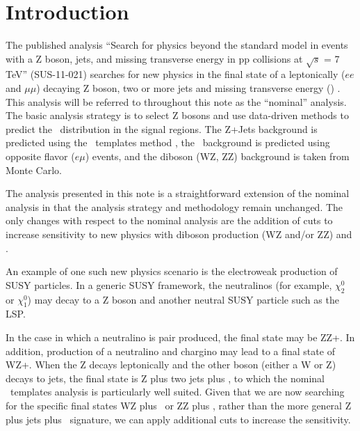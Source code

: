 
\section{Introduction}
\label{ref:intro}

The published analysis 
``Search for physics beyond the standard model in events with a Z boson, jets, 
and missing transverse energy in pp collisions at $\sqrt{s}$ = 7 TeV''
(SUS-11-021) 
searches for new physics in the final state of a 
leptonically ($ee$ and $\mu\mu$) decaying Z boson, two or more jets and 
missing transverse energy (\MET) 
\cite{ref:oszpaper} \cite{ref:osznote} \cite{ref:oszpas}.
This analysis will be referred to throughout this note as the ``nominal''
analysis. The basic analysis strategy is to select Z bosons and 
use data-driven methods to predict the \MET\ distribution in the signal 
regions.
The Z+Jets background is predicted using the 
\MET\ templates method \cite{ref:templates1}\cite{ref:templates2}, the 
\ttbar\ background is predicted using opposite flavor ($e\mu$) events, 
and the diboson (WZ, ZZ) background is taken from Monte Carlo.

The analysis presented in this note is a straightforward extension of
the nominal analysis in that the analysis strategy and methodology
remain unchanged. 
The only changes with respect to the nominal analysis are the addition
of cuts to increase sensitivity to new physics with 
diboson production (WZ and/or ZZ) and \MET .

An example of one such new physics scenario is the electroweak
production of SUSY particles.
In a generic SUSY framework, the neutralinos 
(for example, $\chi_2^0$ or $\chi_1^0$)
may decay to a Z boson and another neutral SUSY particle such as the LSP. 


In the case in which a neutralino is pair produced, the final state 
may be ZZ+\MET. In addition, production of a neutralino and chargino 
may lead to a final state of WZ+\MET.  
When the Z decays leptonically and the other boson (either 
a W or Z) decays to jets, the final state is Z plus two jets plus \MET,
to which the nominal \MET\ templates analysis is particularly well suited. 
Given that we are now searching for the specific final states WZ plus \MET\ or ZZ plus \MET ,
rather than the more general Z plus jets plus \MET\ signature,
we can apply additional cuts to increase the sensitivity.

